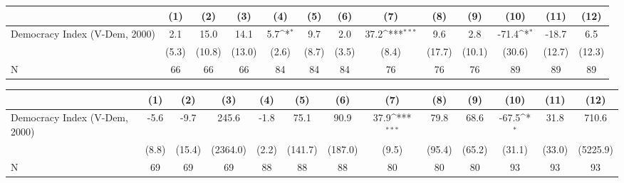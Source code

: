{
\def\sym#1{\ifmmode^{#1}\else\(^{#1}\)\fi}
\begin{tabular}{l*{12}{c}}
\hline\hline
                    &\multicolumn{1}{c}{(1)}         &\multicolumn{1}{c}{(2)}         &\multicolumn{1}{c}{(3)}         &\multicolumn{1}{c}{(4)}         &\multicolumn{1}{c}{(5)}         &\multicolumn{1}{c}{(6)}         &\multicolumn{1}{c}{(7)}         &\multicolumn{1}{c}{(8)}         &\multicolumn{1}{c}{(9)}         &\multicolumn{1}{c}{(10)}         &\multicolumn{1}{c}{(11)}         &\multicolumn{1}{c}{(12)}         \\
\hline
Democracy Index (V-Dem, 2000)&         2.1         &        15.0         &        14.1         &         5.7\sym{*}  &         9.7         &         2.0         &        37.2\sym{***}&         9.6         &         2.8         &       -71.4\sym{*}  &       -18.7         &         6.5         \\
                    &       (5.3)         &      (10.8)         &      (13.0)         &       (2.6)         &       (8.7)         &       (3.5)         &       (8.4)         &      (17.7)         &      (10.1)         &      (30.6)         &      (12.7)         &      (12.3)         \\
\hline
N                   &          66         &          66         &          66         &          84         &          84         &          84         &          76         &          76         &          76         &          89         &          89         &          89         \\
\hline\hline
\end{tabular}
}
{
\def\sym#1{\ifmmode^{#1}\else\(^{#1}\)\fi}
\begin{tabular}{l*{12}{c}}
\hline\hline
                    &\multicolumn{1}{c}{(1)}         &\multicolumn{1}{c}{(2)}         &\multicolumn{1}{c}{(3)}         &\multicolumn{1}{c}{(4)}         &\multicolumn{1}{c}{(5)}         &\multicolumn{1}{c}{(6)}         &\multicolumn{1}{c}{(7)}         &\multicolumn{1}{c}{(8)}         &\multicolumn{1}{c}{(9)}         &\multicolumn{1}{c}{(10)}         &\multicolumn{1}{c}{(11)}         &\multicolumn{1}{c}{(12)}         \\
\hline
Democracy Index (V-Dem, 2000)&        -5.6         &        -9.7         &       245.6         &        -1.8         &        75.1         &        90.9         &        37.9\sym{***}&        79.8         &        68.6         &       -67.5\sym{*}  &        31.8         &       710.6         \\
                    &       (8.8)         &      (15.4)         &    (2364.0)         &       (2.2)         &     (141.7)         &     (187.0)         &       (9.5)         &      (95.4)         &      (65.2)         &      (31.1)         &      (33.0)         &    (5225.9)         \\
\hline
N                   &          69         &          69         &          69         &          88         &          88         &          88         &          80         &          80         &          80         &          93         &          93         &          93         \\
\hline\hline
\end{tabular}
}
